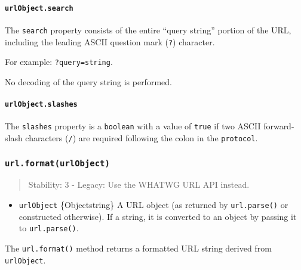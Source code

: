 \paragraph{\texorpdfstring{\texttt{urlObject.search}}{urlObject.search}}\label{urlobject.search}

The \texttt{search} property consists of the entire ``query string''
portion of the URL, including the leading ASCII question mark
(\texttt{?}) character.

For example: \texttt{\textquotesingle{}?query=string\textquotesingle{}}.

No decoding of the query string is performed.

\paragraph{\texorpdfstring{\texttt{urlObject.slashes}}{urlObject.slashes}}\label{urlobject.slashes}

The \texttt{slashes} property is a \texttt{boolean} with a value of
\texttt{true} if two ASCII forward-slash characters (\texttt{/}) are
required following the colon in the \texttt{protocol}.

\subsubsection{\texorpdfstring{\texttt{url.format(urlObject)}}{url.format(urlObject)}}\label{url.formaturlobject}

\begin{quote}
Stability: 3 - Legacy: Use the WHATWG URL API instead.
\end{quote}

\begin{itemize}
\tightlist
\item
  \texttt{urlObject} \{Object\textbar string\} A URL object (as returned
  by \texttt{url.parse()} or constructed otherwise). If a string, it is
  converted to an object by passing it to \texttt{url.parse()}.
\end{itemize}

The \texttt{url.format()} method returns a formatted URL string derived
from \texttt{urlObject}.

